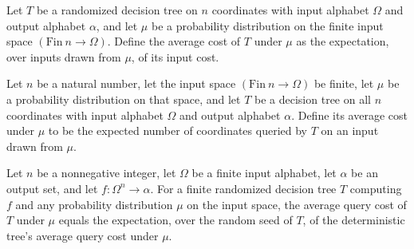 \begin{definition}
\label{FABL.RandomizedDecisionTree.averageCostUnder}
\leanok
{}
Let $T$ be a randomized decision tree on $n$ coordinates with input alphabet $\Omega$
and output alphabet $\alpha$, and let $\mu$ be a probability distribution on the finite
input space $(\mathrm{Fin}\ n\to\Omega)$. Define the average cost of $T$ under $\mu$ as
the expectation, over inputs drawn from $\mu$, of its input cost.
\end{definition}

\begin{definition}
\label{FABL.RandomizedDecisionTree.deterministicAverageCostUnder}
\leanok
{}
Let $n$ be a natural number, let the input space $(\mathrm{Fin}\ n\to\Omega)$ be finite,
let $\mu$ be a probability distribution on that space, and let $T$ be a decision tree on
all $n$ coordinates with input alphabet $\Omega$ and output alphabet $\alpha$. Define
its average cost under $\mu$ to be the expected number of coordinates queried by $T$ on
an input drawn from $\mu$.
\end{definition}

\begin{theorem}
\label{FABL.RandomizedDecisionTree.averageCostUnder_eq_seedExpectation}
\leanok
{}
Let $n$ be a nonnegative integer, let $\Omega$ be a finite input alphabet, let
$\alpha$ be an output set, and let $f:\Omega^n\to\alpha$. For a finite randomized
decision tree $T$ computing $f$ and any probability distribution $\mu$ on the input
space, the average query cost of $T$ under $\mu$ equals the expectation, over the
random seed of $T$, of the deterministic tree's average query cost under $\mu$.
\end{theorem}


